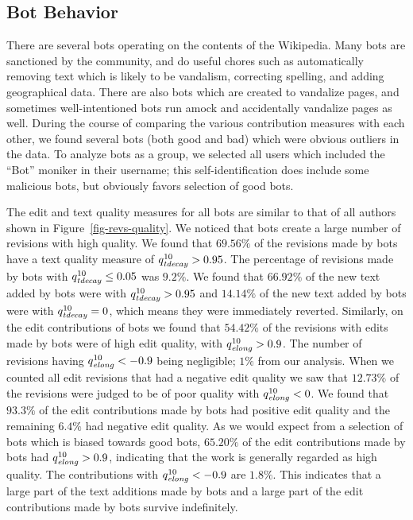 \subsection{Bot Behavior}

There are several bots operating on the contents of the Wikipedia.
Many bots are sanctioned by the community, and do useful
chores such as automatically removing text which is likely
to be vandalism, correcting spelling, and adding geographical data.
There are also bots which are created to vandalize pages,
and sometimes well-intentioned bots run amock and
accidentally vandalize pages as well.
During the course of comparing the various contribution
measures with each other, we found several bots (both
good and bad) which were obvious outliers in the data.
To analyze bots as a group, we selected all users
which included the ``Bot'' moniker in their username;
this self-identification does include some malicious bots,
but obviously favors selection of good bots.

The edit and text quality measures for all bots are similar to
that of all authors shown in Figure~\ref{fig-revs-quality}.
We noticed that bots create a large number of revisions with
high quality.
We found that $69.56\%$ of the revisions made by
bots have a text quality measure of $\quality{tdecay}{10}{} > 0.95$.
The percentage of revisions made by bots with
$\quality{tdecay}{10}{} \le 0.05$ was $9.2\%$.
We found that $66.92\%$ of the new text added by bots were with
$\quality{tdecay}{10}{} > 0.95$ and $14.14\%$ of the new text added by
bots were with $\quality{tdecay}{10}{} = 0$, which means they were
immediately reverted.
Similarly, on the edit contributions of bots we found that
$54.42\%$ of the revisions with edits made by bots were of
high edit quality, with $\quality{elong}{10}{} > 0.9$.
The number of revisions having $\quality{elong}{10}{} < -0.9$ being
negligible; $1\%$ from our analysis.
When we counted all edit revisions that had a negative edit
quality we saw that $12.73\%$ of the revisions were judged to
be of poor quality with $\quality{elong}{10}{} < 0$.
We found that $93.3\%$ of the edit contributions made by bots
had positive edit quality and the remaining $6.4\%$ had
negative edit quality.
As we would expect from a selection of bots which is biased
towards good bots, $65.20\%$ of the edit contributions made
by bots had $\quality{elong}{10}{} > 0.9$, indicating that
the work is generally regarded as high quality.
The contributions with $\quality{elong}{10}{} < -0.9$ are $1.8\%$.
This indicates that a large part of the text additions made by bots
and a large part of the edit contributions made by bots survive
indefinitely.

